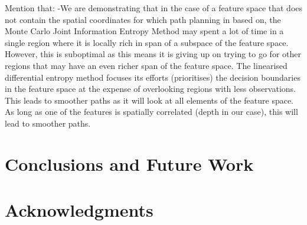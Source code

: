 \documentclass{article}
\begin{document}
		Mention that:
			-We are demonstrating that in the case of a feature space that does not contain the spatial coordinates for which path planning in based on, the Monte Carlo Joint Information Entropy Method may spent a lot of time in a single region where it is locally rich in span of a subspace of the feature space. However, this is suboptimal as this means it is giving up on trying to go for other regions that may have an even richer span of the feature space. The linearised differential entropy method focuses its efforts (prioritises) the decision boundaries in the feature space at the expense of overlooking regions with less observations. This leads to smoother paths as it will look at all elements of the feature space. As long as one of the features is spatially correlated (depth in our case), this will lead to smoother paths.
		
		
\section{Conclusions and Future Work}
\label{Section:Conclusion}

\section*{Acknowledgments}


%
%



\end{document}

